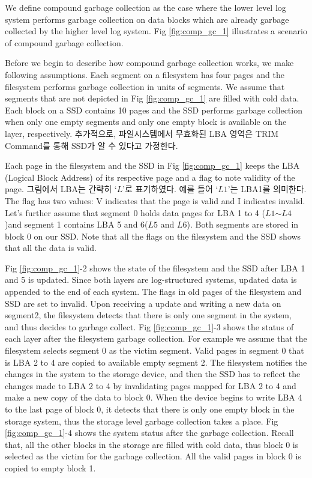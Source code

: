 \documentclass[letterpaper,twocolumn,10pt]{article}
\begin{document}
We define compound garbage collection as the case where the lower level log system performs garbage collection on data blocks which are already garbage collected by the higher level log system. Fig \ref{fig:comp_gc_1} illustrates a scenario of compound garbage collection.

Before we begin to describe how compound garbage collection works, we make following assumptions. Each segment on a filesystem has four pages and the filesystem performs garbage collection in units of segments. We assume that segments that are not depicted in Fig \ref{fig:comp_gc_1} are filled with cold data. Each block on a SSD contains 10 pages and the SSD performs garbage collection when only one empty segments and only one empty block is available on the layer, respectively. 추가적으로, 파일시스템에서 무효화된 LBA 영역은 TRIM Command를 통해 SSD가 알 수 있다고 가정한다.

Each page in the filesystem and the SSD in Fig \ref{fig:comp_gc_1} keeps the LBA (Logical Block Address) of its respective page and a flag to note validity of the page. 그림에서 LBA는 간략히 `$L$'로 표기하였다. 예를 들어 `$L1$'는 LBA1를 의미한다. The flag has two values: V indicates that the page is valid and I indicates invalid. Let’s further assume that segment 0 holds data pages for LBA 1 to 4 ($L1$$\sim$$L4$)and segment 1 contains LBA 5 and 6($L5$ and $L6$).  Both segments are stored in block 0 on our SSD. Note that all the flags on the filesystem and the SSD shows that all the data is valid.

Fig \ref{fig:comp_gc_1}-2 shows the state of the filesystem and the SSD after LBA 1 and 5 is updated. Since both layers are log-structured systems, updated data is appended to the end of each system. The flags in old pages of the filesystem and SSD are set to invalid. Upon receiving a update and writing a new data on segment2, the filesystem detects that there is only one segment in the system, and thus decides to garbage collect. Fig \ref{fig:comp_gc_1}-3 shows the status of each layer after the filesystem garbage collection. For example we assume that the filesystem selects segment 0 as the victim segment. Valid pages in segment 0 that is LBA 2 to 4 are copied to available empty segment 2. The filesystem notifies the changes in the system to the storage device, and then the SSD has to reflect the changes made to LBA 2 to 4 by invalidating pages mapped for LBA 2 to 4 and make a new copy of the data to block 0. When the device begins to write LBA 4 to the last page of block 0, it detects that there is only one empty block in the storage system, thus the storage level garbage collection takes a place. Fig \ref{fig:comp_gc_1}-4 shows the system status after the garbage collection. Recall that, all the other blocks in the storage are filled with cold data, thus block 0 is selected as the victim for the garbage collection.  All the valid pages in block 0 is copied to empty block 1.
\end{document}
